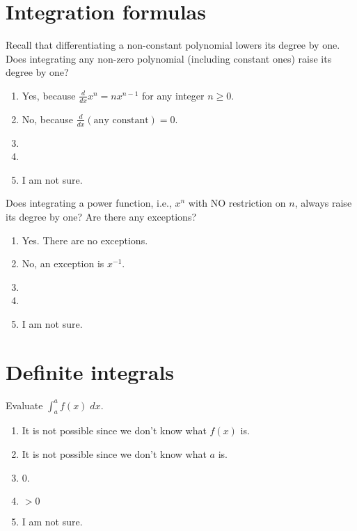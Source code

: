 \documentclass[14pt]{beamer}
\begin{document}
\section{Integration formulas}
\begin{frame}[t]
  Recall that differentiating a {\color{red} non-constant polynomial} lowers its degree by one. Does integrating any {\color{red} non-zero polynomial} (including constant ones) raise its degree by one?

  \medskip
  \begin{enumerate} \setlength\itemsep{1ex}
    \item Yes, because \(\frac{d}{dx} x^{n} = n x^{n-1}\) for any integer \(n \ge 0\).
    \item No, because \(\frac{d}{dx} (\text{any constant}) = 0\).
    \item 
    \item 
    \item I am not sure.
  \end{enumerate} 
\end{frame}

\begin{frame}[t]
  Does integrating a {\color{red} power function}, i.e., \(x^{n}\) with NO restriction on \(n\), always raise its degree by one? Are there any exceptions?

  \medskip
  \begin{enumerate} \setlength\itemsep{1ex}
    \item Yes. There are no exceptions.
    \item No, an exception is \(x^{-1}\).
    \item 
    \item 
    \item I am not sure.
  \end{enumerate} 
\end{frame}

\section{Definite integrals}

\begin{frame}
  Evaluate \(\int_{a}^{a} f(x) \;dx\). 

  \begin{enumerate} \setlength\itemsep{1ex}
    \item It is not possible since we don't know what \(f(x)\) is.
    \item It is not possible since we don't know what \(a\) is.
    \item \(0\).
    \item \(> 0\)
    \item I am not sure.
  \end{enumerate}
\end{frame}
\end{document}
